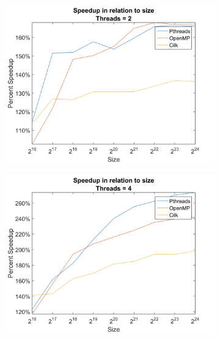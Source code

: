\documentclass[11pt,a4paper,titlepage]{article}
\begin{document}
		\begin{figure}[h!]
			\centering
			\begin{subfigure}[b]{0.45\textwidth}
				\includegraphics[width=\textwidth]{figures/figure-4.1.png}
				\caption{}
			\end{subfigure}
			\begin{subfigure}[b]{0.45\textwidth}
				\includegraphics[width=\textwidth]{figures/figure-4.2.png}
				\caption{}
			\end{subfigure}
			\begin{subfigure}[b]{0.45\textwidth}

\end{subfigure}
\end{figure}
\end{document}

